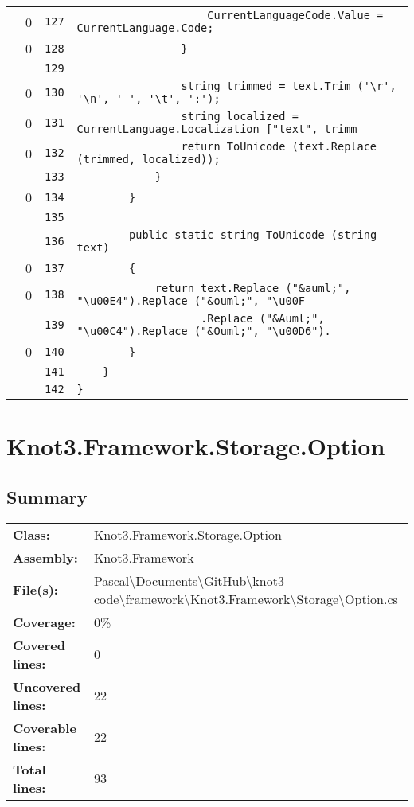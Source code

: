 \documentclass[a4paper,10pt]{article}
\begin{document}
\begin{longtable}[l]{lrrl}
\cellcolor{red} & 0 & \verb~127~ & \verb~                    CurrentLanguageCode.Value = CurrentLanguage.Code;~\\
\cellcolor{red} & 0 & \verb~128~ & \verb~                }~\\
\cellcolor{gray} &  & \verb~129~ & \verb~~\\
\cellcolor{red} & 0 & \verb~130~ & \verb~                string trimmed = text.Trim ('\r', '\n', ' ', '\t', ':');~\\
\cellcolor{red} & 0 & \verb~131~ & \verb~                string localized = CurrentLanguage.Localization ["text", trimm~\\
\cellcolor{red} & 0 & \verb~132~ & \verb~                return ToUnicode (text.Replace (trimmed, localized));~\\
\cellcolor{gray} &  & \verb~133~ & \verb~            }~\\
\cellcolor{red} & 0 & \verb~134~ & \verb~        }~\\
\cellcolor{gray} &  & \verb~135~ & \verb~~\\
\cellcolor{gray} &  & \verb~136~ & \verb~        public static string ToUnicode (string text)~\\
\cellcolor{red} & 0 & \verb~137~ & \verb~        {~\\
\cellcolor{red} & 0 & \verb~138~ & \verb~            return text.Replace ("&auml;", "\u00E4").Replace ("&ouml;", "\u00F~\\
\cellcolor{gray} &  & \verb~139~ & \verb~                   .Replace ("&Auml;", "\u00C4").Replace ("&Ouml;", "\u00D6").~\\
\cellcolor{red} & 0 & \verb~140~ & \verb~        }~\\
\cellcolor{gray} &  & \verb~141~ & \verb~    }~\\
\cellcolor{gray} &  & \verb~142~ & \verb~}~\\
\end{longtable}
\newpage
\section{Knot3.Framework.Storage.Option}
\subsection{Summary}
\begin{longtable}[l]{ll}
\textbf{Class:} & Knot3.Framework.Storage.Option\\
\textbf{Assembly:} & Knot3.Framework\\
\textbf{File(s):} & \begin{minipage}[t]{12cm}{Pascal\textbackslash Documents\textbackslash GitHub\textbackslash knot3-code\textbackslash framework\textbackslash Knot3.Framework\textbackslash Storage\textbackslash Option.cs}\end{minipage} \\
\textbf{Coverage:} & 0\%\\
\textbf{Covered lines:} & 0\\
\textbf{Uncovered lines:} & 22\\
\textbf{Coverable lines:} & 22\\
\textbf{Total lines:} & 93\\
\end{longtable}
\end{document}
